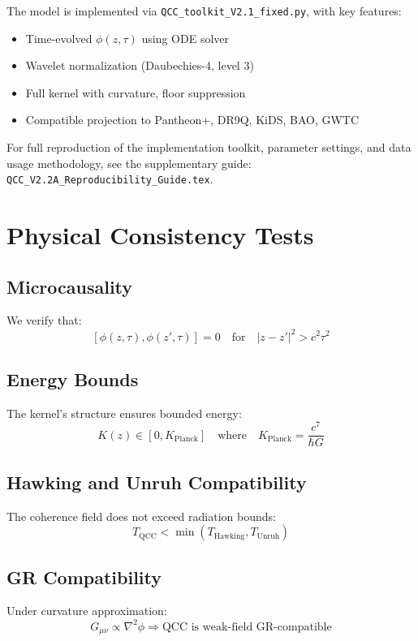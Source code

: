 \documentclass[12pt]{article}
\begin{document}
\noindent The model is implemented via \texttt{QCC\_toolkit\_V2.1\_fixed.py}, with key features:

\begin{itemize}
	\item Time-evolved $\phi(z, \tau)$ using ODE solver
	\item Wavelet normalization (Daubechies-4, level 3)
	\item Full kernel with curvature, floor suppression
	\item Compatible projection to Pantheon+, DR9Q, KiDS, BAO, GWTC
\end{itemize}

For full reproduction of the implementation toolkit, parameter settings, and data usage methodology, see the supplementary guide: \newline
\texttt{QCC\_V2.2A\_Reproducibility\_Guide.tex}.

\section{Physical Consistency Tests}
\subsection{Microcausality}
We verify that:
\begin{equation}
\left[ \phi(z, \tau), \phi(z', \tau) \right] = 0 \quad \text{for} \quad |z - z'|^2 > c^2 \tau^2
\end{equation}

\subsection{Energy Bounds}
The kernel’s structure ensures bounded energy:
\begin{equation}
K(z) \in [0, K_{\text{Planck}}] \quad \text{where} \quad K_{\text{Planck}} = \frac{c^7}{\hbar G}
\end{equation}

\subsection{Hawking and Unruh Compatibility}
The coherence field does not exceed radiation bounds:
\begin{equation}
T_{\text{QCC}} < \min(T_{\text{Hawking}}, T_{\text{Unruh}})
\end{equation}

\subsection{GR Compatibility}
Under curvature approximation:
\begin{equation}
G_{\mu\nu} \propto \nabla^2 \phi \Rightarrow \text{QCC is weak-field GR-compatible}
\end{equation}
\end{document}
